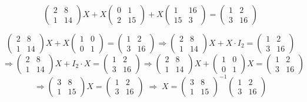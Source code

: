 \documentclass[a4paper,12pt]{article}
\begin{document}
\begin{ejercicio}[title=Ejercicio 20]
\[
\begin{pmatrix}
2 & 8\\
1 & 14
\end{pmatrix} X
+
X
\begin{pmatrix}
0 & 1\\
2 & 15
\end{pmatrix}
+
X
\begin{pmatrix}
1 & 16\\
15 & 3
\end{pmatrix}
=
\begin{pmatrix}
1 & 2\\
3 & 16
\end{pmatrix}
\]

\[
\begin{pmatrix}
2 & 8\\
1 & 14
\end{pmatrix} X
+
X
\begin{pmatrix}
1 & 0\\
0 & 1
\end{pmatrix}
=
\begin{pmatrix}
1 & 2\\
3 & 16
\end{pmatrix}
\Rightarrow
\begin{pmatrix}
2 & 8\\
1 & 14
\end{pmatrix} X
+
X \cdot I_2
=
\begin{pmatrix}
1 & 2\\
3 & 16
\end{pmatrix}
\]
\[
\Rightarrow
\begin{pmatrix}
2 & 8\\
1 & 14
\end{pmatrix} X
+
I_2 \cdot X
=
\begin{pmatrix}
1 & 2\\
3 & 16
\end{pmatrix}
\Rightarrow
\begin{pmatrix}
2 & 8\\
1 & 14
\end{pmatrix} X
+
\begin{pmatrix}
1 & 0\\
0 & 1
\end{pmatrix}
X
=
\begin{pmatrix}
1 & 2\\
3 & 16
\end{pmatrix}
\]
\[
\Rightarrow
\begin{pmatrix}
3 & 8\\
1 & 15
\end{pmatrix} X
=
\begin{pmatrix}
1 & 2\\
3 & 16
\end{pmatrix}
\;\Rightarrow\;
X = 
\begin{pmatrix}
3 & 8\\
1 & 15
\end{pmatrix}^{-1}
\begin{pmatrix}
1 & 2\\
3 & 16
\end{pmatrix}
\]


\end{ejercicio}
\end{document}
